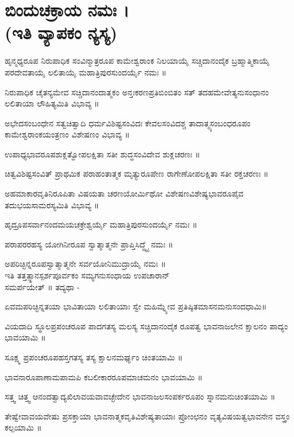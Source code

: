 \section{ಬಿಂದುಚಕ್ರಾಯ ನಮಃ ।\\ (ಇತಿ ವ್ಯಾಪಕಂ ನ್ಯಸ್ಯ)}
ಹೃನ್ಮಧ್ಯರೂಪ ನಿರುಪಾಧಿಕ ಸಂವಿನ್ಮಾತ್ರರೂಪ ಕಾಮೇಶ್ವರಾಂಕ ನಿಲಯಾಯೈ ಸಚ್ಚಿದಾನಂದೈಕ ಬ್ರಹ್ಮಾತ್ಮಿಕಾಯೈ ಪರದೇವತಾಯೈ ಲಲಿತಾಯೈ ಮಹಾತ್ರಿಪುರಸುಂದರ್ಯೈ ನಮಃ ॥

ನಿರುಪಾಧಿಕ ಚೈತನ್ಯಮೇವ ಸಚ್ಚಿದಾನಂದಾತ್ಮಕಂ ಅನ್ತಃಕರಣಪ್ರತಿಬಿಂಬಿತಂ ಸತ್ ತದಹಮೇವೇತ್ಯನುಸಂಧಾನಂ ಲಲಿತಾಯಾ ಲೌಹಿತ್ಯಮಿತಿ ವಿಭಾವ್ಯ ॥

ಅಭೇದಸಂಬಂಧೇನ ಸತ್ವಚಿತ್ವಾದಿ ಧರ್ಮವಿಶಿಷ್ಟಸಂವಿದಃ ಕೇವಲಸಂವಿದಶ್ಚ ತಾದಾತ್ಮ್ಯಸಂಬಂಧರೂಪಂ ಕಾಮೇಶ್ವರಾಂಕಯಂತ್ರಣಂ ವಿಶೇಷಣಂ ವಿಭಾವ್ಯ ॥

ಉಪಾಧ್ಯಭಾವರೂಪಶುಕ್ಲತ್ವೋಪಲಕ್ಷಿತಾ ಸತೀ ಶುದ್ಧಸಂವಿದೇವ ಶುಕ್ಲಚರಣಃ ॥

ಚಿತ್ವವಿಶಿಷ್ಟಸಂವಿತ್ ಪ್ರಾಥಮಿಕ ಪರಾಹಂತಾತ್ಮಕ ಮೃತ್ಯುರೂಪೇಣ ರಾಗೇಣೋಪಲಕ್ಷಿತಾ ಸತೀ ರಕ್ತಚರಣಃ ॥

ಅಹಮಾಕಾರವೃತಿನಿರೂಪಿತಾ ವಿಷಯತಾ ಚರಣಯೋರ್ಮಿಥೋ ವಿಶೇಷಣವಿಶೇಷ್ಯಭಾವರೂಪೈವ ತದುಭಯಸಾಮರಸ್ಯಮಿತಿ ವಿಭಾವ್ಯ ॥

ಹೃದ್ರೂಪಸರ್ವಾನಂದಮಯಚಕ್ರೇಶ್ವರ್ಯೈ ಮಹಾತ್ರಿಪುರಸುಂದರ್ಯೈ ನಮಃ ॥

ಪರಾಪರರಹಸ್ಯ ಯೋಗಿನೀರೂಪ ಸ್ವಾತ್ಮಾತ್ಮನೇ ಪ್ರಾಪ್ತಿಸಿದ್ಧ್ಯೈ ನಮಃ ॥

ಅಪರಿಚ್ಛಿನ್ನರೂಪಸ್ವಾತ್ಮಾತ್ಮನೇ ಸರ್ವಯೋನಿಮುದ್ರಾಯೈ ನಮಃ ॥\\
ಇತಿ ತತ್ತತ್ಸ್ಥಾನಸ್ಪರ್ಶಪೂರ್ವಕಂ ಸಮ್ಯಗನುಸಂಧಾಯ ಉಪಚಾರಾನ್\\ ಸಮರ್ಪಯೇತ್ ॥
ತದ್ಯಥಾ  -

ಏವಮಪರಿಚ್ಛಿನ್ನತಯಾ ಭಾವಿತಾಯಾ ಲಲಿತಾಯಾಃ ಸ್ವೇ ಮಹಿಮ್ನ್ಯೇವ ಪ್ರತಿಷ್ಠಿತಮಾಸನಮನುಸಂದಧಾಮಿ॥

ವಿಯದಾದಿ ಸ್ಥೂಲಪ್ರಪಂಚರೂಪ ಪಾದಗತಸ್ಯ ಮಲಸ್ಯ ಸಚ್ಚಿದಾನಂದೈಕ ರೂಪತ್ವ ಭಾವನಾಜಲೇನ ಕ್ಷಾಲನಂ ಪಾದ್ಯಂ ಭಾವಯಾಮಿ ॥

ಸೂಕ್ಷ್ಮ ಪ್ರಪಂಚರೂಪಹಸ್ತಗತಸ್ಯ ತಸ್ಯ ಕ್ಷಾಲನಮರ್ಘ್ಯಂ ಚಿಂತಯಾಮಿ ॥

ಭಾವನಾರೂಪಾಣಾಮಪಾಮಪಿ ಕಬಲೀಕಾರರೂಪಮಾಚಮನಂ ಭಾವಯಾಮಿ ॥

ಸತ್ತ್ವ ಚಿತ್ತ್ವ ಆನಂದತ್ವಾದ್ಯಖಿಲಾವಯವಾವಚ್ಛೇದೇನ ಭಾವನಾಜಲಸಂಪರ್ಕರೂಪಂ ಸ್ನಾನಮನುಚಿಂತಯಾಮಿ ॥

ತೇಷ್ವೇವಾವಯವೇಷು ಪ್ರಸಕ್ತಾಯಾ ಭಾವನಾತ್ಮಕವೃತಿವಿಶೇಷ್ಯತಾಯಾಃ ಪ್ರೋಂಛನಂ ವೃತ್ಯವಿಷಯತ್ವಭಾವನೇನ ವಸ್ತ್ರಂ ಕಲ್ಪಯಾಮಿ ॥

